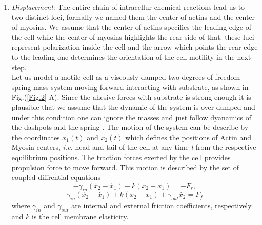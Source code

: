 \documentclass[10pt,letterpaper]{article}
\begin{document}
\begin{enumerate}
\begin{table}[!ht]
\begin{adjustwidth}{0in}{0in}
\begin{tabular}{l   l l l}
\end{tabular}
\label{tab1}
\end{adjustwidth}
\end{table}
\item \textit{Displacement}:
  The entire chain of  intracellur chemical reactions lead us to two distinct  loci, formally we named them the center of actins and the center of myosins. We assume that the center of actins specifies the leading edge of the cell while the center of myosins highlights the rear side of that. these luci represent polarization inside the cell  and the arrow which points the rear edge to the leading one determines the orientation of the cell motility in the next step.\\
Let us model a motile cell  as a viscously damped two degrees of freedom spring-mass system moving forward interacting with substrate, as shown in Fig.(\ref{Fig.2}-A). Since the ahesive forces with substrate is strong enough it is plausible that we assume that the dynamic of the system is over damped and under this condition one can ignore the masses and just follow dyanamics of  the dashpots and the spring . The motion of the system can be describe by the coordinates $x_1(t)$ and $x_2(t)$ which defines the positions of Actin and Myosin centers, \textit{i.e.} head and tail of the cell at any time \textit{t} from the respective equilibrium positions. %
 The traction forces exerted by the cell provides propulsion force to move forward. This motion is described by the set of coupled diffrential equations
\begin{equation}
-\gamma_{in}(\dot{x_2}-\dot{x_1})-k(x_2-x_1)=-F_r,
\end{equation}
\begin{equation}
\gamma_{in}(\dot{x_2}-\dot{x_1})+k(x_2-x_1)+\gamma_{out}\dot{x_2}=F_f
\end{equation}
where $\gamma_{in}$ and $\gamma_{out}$ are internal and external friction coefficients, respectively and $k$ is the cell membrane elasticity.
\end{enumerate}
\end{document}
